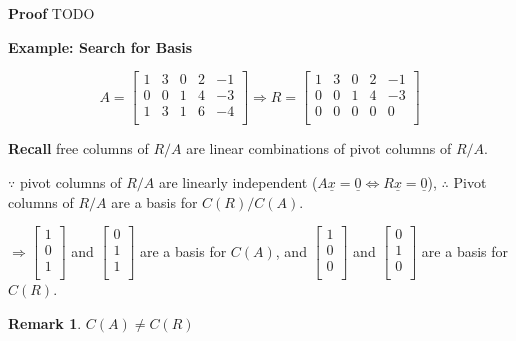 \documentclass[12pt,a4paper]{article}
\newtheorem*{rem}{Remark}
\newcommand{\Remark}[1]{
  \begin{rem}
    \color{cyan}
    #1
  \end{rem}
}
\begin{document}
\textbf{Proof} TODO

\textbf{Example: Search for Basis}

\[
A = 
\begin{bmatrix}
  1 & 3 & 0 & 2 & -1 \\
  0 & 0 & 1 & 4 & -3 \\
  1 & 3 & 1 & 6 & -4 \\
\end{bmatrix} \Rightarrow
R = 
\begin{bmatrix}
  \boxed{1} & 3 & 0 & 2 & -1 \\
  0 & 0 & \boxed{1} & 4 & -3 \\
  0 & 0 & 0 & 0 & 0 \\
\end{bmatrix}
\]

\textbf{Recall} free columns of $R/A$ are linear combinations of pivot columns of $R/A$.

$\because$ pivot columns of $R/A$ are linearly independent ($A\underline{x} = \underline{0} \iff R\underline{x} = \underline{0}$),
$\therefore$ Pivot columns of $R/A$ are a basis for $C(R)/C(A)$.

$
\Rightarrow
\begin{bmatrix}
  1 \\
  0 \\
  1 \\
\end{bmatrix}
$ and 
$
\begin{bmatrix}
  0 \\
  1 \\
  1 \\
\end{bmatrix}
$ are a basis for $C(A)$, and
$
\begin{bmatrix}
  1 \\
  0 \\
  0 \\
\end{bmatrix}
$ and 
$
\begin{bmatrix}
  0 \\
  1 \\
  0 \\
\end{bmatrix}
$ are a basis for $C(R)$.

\Remark{$C(A) \neq C(R)$}
\end{document}
